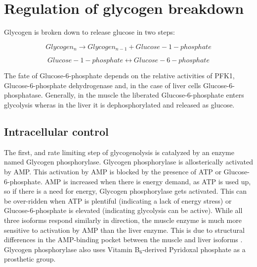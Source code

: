 \documentclass{tufte-handout}
\begin{document}
\section{Regulation of glycogen breakdown}

Glycogen is broken down to release glucose in two steps:

\begin{equation}
Glycogen_{n} \rightarrow Glycogen_{n-1} + Glucose-1-phosphate
\end{equation}

\begin{equation}
Glucose-1-phosphate \leftrightarrow Glucose-6-phosphate
\end{equation}

The fate of Glucose-6-phosphate depends on the relative activities of PFK1, Glucose-6-phosphate dehydrogenase and, in the case of liver cells Glucose-6-phosphatase.  Generally, in the muscle the liberated Glucose-6-phosphate enters glycolysis wheras in the liver it is dephosphorylated and released as glucose.

\subsection{Intracellular control}

The first, and rate limiting step of glycogenolysis is catalyzed by an enzyme named Glycogen phosphorylase.  Glycogen phosphorylase is allosterically activated by AMP.  This activation by AMP is blocked by the presence of ATP or Glucose-6-phosphate.  AMP is increased when there is energy demand, as ATP is used up, so if there is a need for energy, Glycogen phosphorylase gets activated.  This can be over-ridden when ATP is plentiful (indicating a lack of energy stress) or Glucose-6-phosphate is elevated (indicating glycolysis can be active).  While all three isoforms respond similarly in direction, the muscle enzyme is much more sensitive to activation by AMP than the liver enzyme.  This is due to structural differences in the AMP-binding pocket between the muscle and liver isoforms \citep{Rath2000}.  Glycogen phosphorylase also uses Vitamin B$_6$-derived Pyridoxal phosphate as a prosthetic group.
\end{document}
